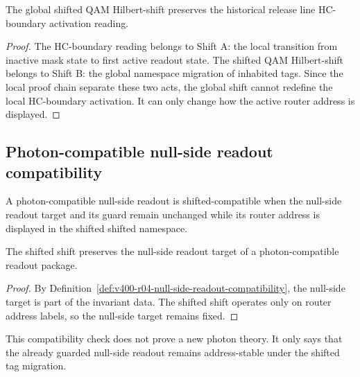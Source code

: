 \begin{proposition}
\label{prop:v400-r04-hc-boundary-survives-global-shift}
The global shifted QAM Hilbert-shift preserves the historical release line HC-boundary activation
reading.
\end{proposition}

\begin{proof}
The HC-boundary reading belongs to Shift A: the local transition from inactive
mask state to first active readout state. The shifted QAM Hilbert-shift belongs to
Shift B: the global namespace migration of inhabited tags. Since the local proof chain
separate these two acts, the global shift cannot redefine the local HC-boundary
activation. It can only change how the active router address is displayed.
\end{proof}

\subsection{Photon-compatible null-side readout compatibility}
\label{subsec:v400-r04-photon-null-side-readout-compatibility}

\begin{definition}
\label{def:v400-r04-null-side-readout-compatibility}
A photon-compatible null-side readout is shifted-compatible when the null-side
readout target and its guard remain unchanged while its router address is
displayed in the shifted shifted namespace.
\end{definition}

\begin{lemma}
\label{lem:v400-r04-null-side-target-preservation}
The shifted shift preserves the null-side readout target of a photon-compatible
readout package.
\end{lemma}

\begin{proof}
By Definition~\ref{def:v400-r04-null-side-readout-compatibility}, the null-side
target is part of the invariant data. The shifted shift operates only on router
address labels, so the null-side target remains fixed.
\end{proof}

\begin{remark}
\label{rem:v400-r04-no-photon-proof-claim}
This compatibility check does not prove a new photon theory. It only says that
the already guarded null-side readout remains address-stable under the shifted tag
migration.
\end{remark}

